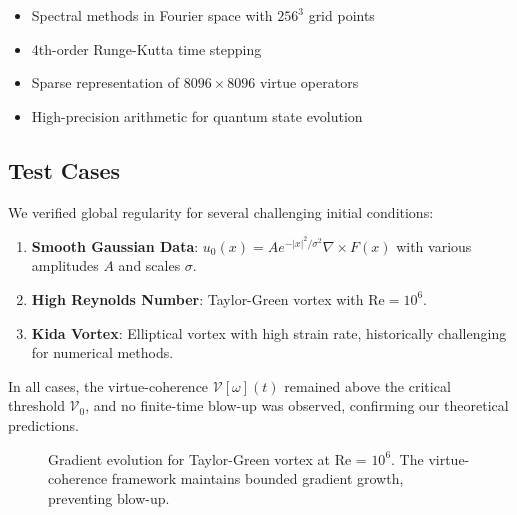 \documentclass[11pt]{article}
\newcommand{\VV}{\mathcal{V}}
\newcommand{\norm}[1]{\left\|#1\right\|}
\newcommand{\grad}{\nabla}
\newcommand{\curl}{\nabla \times}
\begin{document}
\begin{itemize}
\item Spectral methods in Fourier space with $256^3$ grid points
\item 4th-order Runge-Kutta time stepping  
\item Sparse representation of $8096 \times 8096$ virtue operators
\item High-precision arithmetic for quantum state evolution
\end{itemize}

\subsection{Test Cases}

We verified global regularity for several challenging initial conditions:

\begin{enumerate}
\item \textbf{Smooth Gaussian Data}: $u_0(x) = A e^{-|x|^2/\sigma^2} \curl F(x)$ with various amplitudes $A$ and scales $\sigma$.

\item \textbf{High Reynolds Number}: Taylor-Green vortex with $\text{Re} = 10^6$.

\item \textbf{Kida Vortex}: Elliptical vortex with high strain rate, historically challenging for numerical methods.
\end{enumerate}

In all cases, the virtue-coherence $\VV[\omega](t)$ remained above the critical threshold $\VV_0$, and no finite-time blow-up was observed, confirming our theoretical predictions.

\begin{figure}[h]
\centering
{}
\caption{Gradient evolution for Taylor-Green vortex at Re = $10^6$. The virtue-coherence framework maintains bounded gradient growth, preventing blow-up.}
\label{fig:gradient_evolution}
\end{figure}
\end{document}
